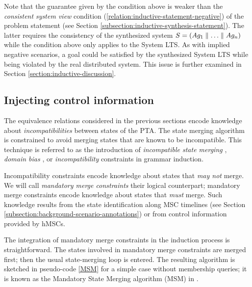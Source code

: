 Note that the guarantee given by the condition above is weaker than the \emph{consistent system view} condition (\ref{relation:inductive-statement-negative}) of the problem statement (see Section \ref{subsection:inductive-synthesis-statement}). The latter requires the consistency of the synthesized system $S = (Ag_1 \parallel \ldots \parallel Ag_n)$ while the condition above only applies to the System LTS. As with implied negative scenarios, a goal could be satisfied by the synthesized System LTS while being violated by the real distributed system. This issue is further examined in Section \ref{section:inductive-discussion}.


\subsection{Injecting control information\label{subsection:induction-pruning-with-control-information}}

The equivalence relations considered in the previous sections encode knowledge about \emph{incompatibilities} between states of the PTA. The state merging algorithm is constrained to avoid merging states that are known to be incompatible. This technique is referred to as the introduction of \emph{incompatible state merging} \cite{Coste:1998}, \emph{domain bias} \cite{Coste:2004}, or \emph{incompatibility} constraints \cite{Lambeau:2008} in grammar induction.

Incompatibility constraints encode knowledge about states that \emph{may not} merge. We will call \emph{mandatory merge constraints} their logical counterpart; mandatory merge constraints encode knowledge about states that \emph{must} merge. Such knowledge results from the state identification along MSC timelines (see Section \ref{subsection:background-scenario-annotations}) or from control information provided by hMSCs.

The integration of mandatory merge constraints in the induction process is straightforward. The states involved in mandatory merge constraints are merged first; then the usual state-merging loop is entered. The resulting algorithm is sketched in pseudo-code \ref{MSM} for a simple case without membership queries; it is known as the Mandatory State Merging algorithm (MSM) in \cite{Lambeau:2008}.

